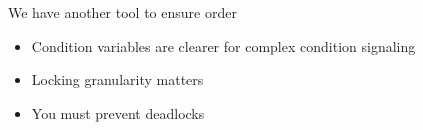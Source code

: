   \begin{slide}


    We have another tool to ensure order

    \begin{itemize}
      \item Condition variables are clearer for complex condition signaling
      \item Locking granularity matters
      \item You must prevent deadlocks
    \end{itemize}

  \end{slide}


